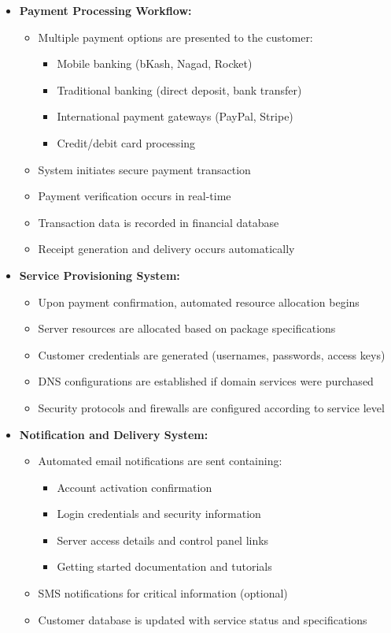 \begin{itemize}
    \item \textbf{Payment Processing Workflow:}
    \begin{itemize}
        \item Multiple payment options are presented to the customer:
        \begin{itemize}
            \item Mobile banking (bKash, Nagad, Rocket)
            \item Traditional banking (direct deposit, bank transfer)
            \item International payment gateways (PayPal, Stripe)
            \item Credit/debit card processing
        \end{itemize}
        \item System initiates secure payment transaction
        \item Payment verification occurs in real-time
        \item Transaction data is recorded in financial database
        \item Receipt generation and delivery occurs automatically
    \end{itemize}

    \item \textbf{Service Provisioning System:}
    \begin{itemize}
        \item Upon payment confirmation, automated resource allocation begins
        \item Server resources are allocated based on package specifications
        \item Customer credentials are generated (usernames, passwords, access keys)
        \item DNS configurations are established if domain services were purchased
        \item Security protocols and firewalls are configured according to service level
    \end{itemize}

    \item \textbf{Notification and Delivery System:}
    \begin{itemize}
        \item Automated email notifications are sent containing:
        \begin{itemize}
            \item Account activation confirmation
            \item Login credentials and security information
            \item Server access details and control panel links
            \item Getting started documentation and tutorials
        \end{itemize}
        \item SMS notifications for critical information (optional)
        \item Customer database is updated with service status and specifications
    \end{itemize}


\end{itemize}
